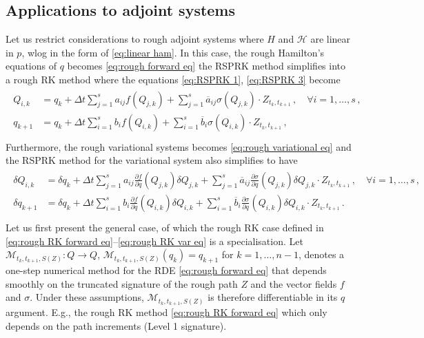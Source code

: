 \documentclass[11pt, oneside]{article}
\numberwithin{equation}{section}
\theoremstyle{definition}
\newcommand{\ob}[1]{\overline{#1}}
\newcommand{\mc}[1]{\mathcal{#1}}
\newcommand{\mcal}[1]{\mc{#1}}
\def\p{{\partial}}
\def\p{\partial}
\begin{document}
\subsection{Applications to adjoint systems}\label{subsec:rough RK adjoint}
Let us restrict considerations to rough adjoint systems where $H$ and $\mcal{H}$ are linear in $p$, wlog in the form of \eqref{eq:linear ham}. In this case, the rough Hamilton's equations of $q$ becomes \eqref{eq:rough forward eq} the RSPRK method simplifies into a rough RK method where the equations \eqref{eq:RSPRK 1}, \eqref{eq:RSPRK 3} become
\begin{align}
\begin{split}\label{eq:rough RK forward eq}
    Q_{i,k} &= q_k + \Delta t \sum_{j=1}^s a_{ij} f(Q_{j,k}) + \sum_{j=1}^s \ob{a}_{ij}\sigma(Q_{j,k})\cdot Z_{t_k, t_{k+1}}\,,\quad \forall i = 1,\ldots,s\,,\\
    q_{k+1} &= q_k + \Delta t \sum_{i=1}^s b_i f(Q_{i,k}) + \sum_{i=1}^s \ob{b}_i\sigma(Q_{i,k})\cdot Z_{t_k, t_{k+1}}\,,\\
\end{split}
\end{align}
Furthermore, the rough variational systems becomes \eqref{eq:rough variational eq} and the RSPRK method for the variational system also simplifies to have
\begin{align}\label{eq:rough RK var eq}
    \begin{split}
    \delta Q_{i,k} &= \delta q_k + \Delta t \sum_{j=1}^s a_{ij} \frac{\p f}{\p q}(Q_{j,k}) \delta Q_{j,k} + \sum_{j=1}^s \ob{a}_{ij}\frac{\p \sigma}{\p q}(Q_{j,k})\delta Q_{j,k}\cdot Z_{t_k, t_{k+1}}\,,\quad \forall i = 1,\ldots,s\,,\\
    \delta q_{k+1} &= \delta q_k + \Delta t \sum_{i=1}^s b_i \frac{\p f}{\p q}(Q_{i,k}) \delta Q_{i,k} + \sum_{i=1}^s \ob{b}_i\frac{\p \sigma}{\p q}(Q_{i,k})\delta Q_{i,k}\cdot Z_{t_k, t_{k+1}}\,.\\
    \end{split}
\end{align}
Let us first present the general case, of which the rough RK case defined in \eqref{eq:rough RK forward eq}--\eqref{eq:rough RK var eq} is a specialisation. Let $\mcal{M}_{t_k, t_{k+1}, S(Z)} : Q \rightarrow Q$, $\mcal{M}_{t_k, t_{k+1}, S(Z)}(q_k) = q_{k+1}$ for $k=1,\ldots,n-1$, denotes a one-step numerical method for the RDE \eqref{eq:rough forward eq} that depends smoothly on the truncated signature of the rough path $Z$ and the vector fields $f$ and $\sigma$. Under these assumptions, $\mcal{M}_{t_k, t_{k+1}, S(Z)}$ is therefore differentiable in its $q$ argument. E.g., the rough RK method \eqref{eq:rough RK forward eq} which only depends on the path increments (Level 1 signature).
\end{document}
